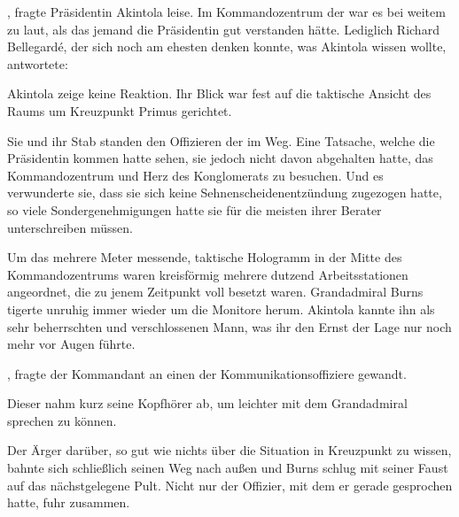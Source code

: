 , fragte Präsidentin Akintola leise. Im Kommandozentrum der  war es bei weitem zu laut, als das jemand die Präsidentin gut verstanden hätte. Lediglich Richard Bellegardé, der sich noch am ehesten denken konnte, was Akintola wissen wollte, antwortete: 

\par

Akintola zeige keine Reaktion. Ihr Blick war fest auf die taktische Ansicht des Raums um Kreuzpunkt Primus gerichtet.

\par

Sie und ihr Stab standen den Offizieren der  im Weg. Eine Tatsache, welche die Präsidentin kommen hatte sehen, sie jedoch nicht davon abgehalten hatte, das Kommandozentrum und Herz des Konglomerats zu besuchen. Und es verwunderte sie, dass sie sich keine Sehnenscheidenentzündung zugezogen hatte, so viele Sondergenehmigungen hatte sie für die meisten ihrer Berater unterschreiben müssen.

\par

Um das mehrere Meter messende, taktische Hologramm in der Mitte des Kommandozentrums waren kreisförmig mehrere dutzend Arbeitsstationen angeordnet, die zu jenem Zeitpunkt voll besetzt waren. Grandadmiral Burns tigerte unruhig immer wieder um die Monitore herum. Akintola kannte ihn als sehr beherrschten und verschlossenen Mann, was ihr den Ernst der Lage nur noch mehr vor Augen führte.

\par

, fragte der Kommandant an einen der Kommunikationsoffiziere gewandt.

\par

Dieser nahm kurz seine Kopfhörer ab, um leichter mit dem Grandadmiral sprechen zu können. 

\par

Der Ärger darüber, so gut wie nichts über die Situation in Kreuzpunkt zu wissen, bahnte sich schließlich seinen Weg nach außen und Burns schlug mit seiner Faust auf das nächstgelegene Pult. Nicht nur der Offizier, mit dem er gerade gesprochen hatte, fuhr zusammen.

